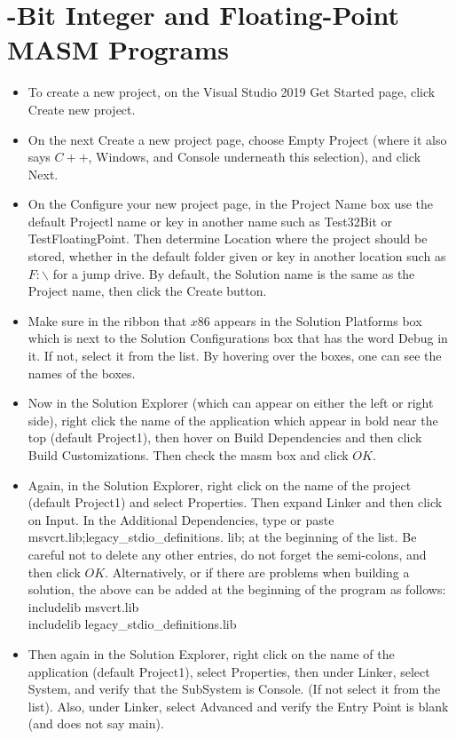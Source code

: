 \documentclass[10pt]{book}
\begin{document}
\section{-Bit Integer and Floating-Point MASM Programs}
\begin{itemize}
  \item To create a new project, on the Visual Studio 2019 Get Started page, click Create new project.
  \item On the next Create a new project page, choose Empty Project (where it also says $C++$, Windows, and Console underneath this selection), and click Next.
  \item On the Configure your new project page, in the Project Name box use the default Projectl name or key in another name such as Test32Bit or TestFloatingPoint. Then determine Location where the project should be stored, whether in the default folder given or key in another location such as $F: \backslash$ for a jump drive. By default, the Solution name is the same as the Project name, then click the Create button.
  \item Make sure in the ribbon that $x 86$ appears in the Solution Platforms box which is next to the Solution Configurations box that has the word Debug in it. If not, select it from the list. By hovering over the boxes, one can see the names of the boxes.
  \item Now in the Solution Explorer (which can appear on either the left or right side), right click the name of the application which appear in bold near the top (default Project1), then hover on Build Dependencies and then click Build Customizations. Then check the masm box and click $O K$.
  \item Again, in the Solution Explorer, right click on the name of the project (default Project1) and select Properties. Then expand Linker and then click on Input. In the Additional Dependencies, type or paste msvcrt.lib;legacy\_stdio\_definitions. lib; at the beginning of the list. Be careful not to delete any other entries, do not forget the semi-colons, and then click $O K$. Alternatively, or if there are problems when building a solution, the above can be added at the beginning of the program as follows:\\
includelib msvcrt.lib\\
includelib legacy\_stdio\_definitions.lib
  \item Then again in the Solution Explorer, right click on the name of the application (default Project1), select Properties, then under Linker, select System, and verify that the SubSystem is Console. (If not select it from the list). Also, under Linker, select Advanced and verify the Entry Point is blank (and does not say main).

\end{itemize}
\end{document}
